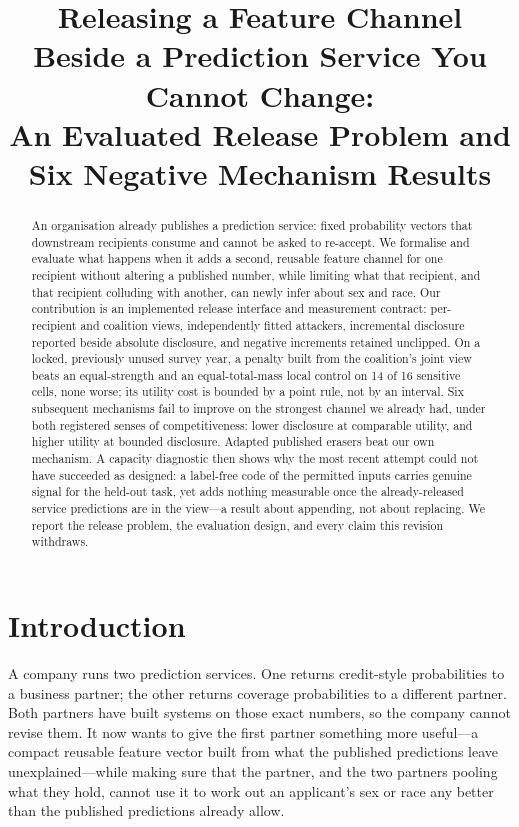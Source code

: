 \documentclass[conference]{IEEEtran}
\begin{document}
\title{Releasing a Feature Channel Beside a Prediction Service You Cannot Change:\\
An Evaluated Release Problem and Six Negative Mechanism Results}

\author{}

\maketitle

\begin{abstract}
An organisation already publishes a prediction service: fixed probability vectors that downstream
recipients consume and cannot be asked to re-accept. We formalise and evaluate what happens when it adds
a second, reusable feature channel for one recipient without altering a published number, while limiting
what that recipient, and that recipient colluding with another, can newly infer about sex and race. Our
contribution is an implemented release interface and measurement contract: per-recipient and coalition
views, independently fitted attackers, incremental disclosure reported beside absolute disclosure, and
negative increments retained unclipped. On a locked, previously unused survey year, a penalty built from
the coalition's joint view beats an equal-strength and an equal-total-mass local control on 14 of 16
sensitive cells, none worse; its utility cost is bounded by a point rule, not by an interval. Six
subsequent mechanisms fail to improve on the strongest channel we already had, under both registered
senses of competitiveness: lower disclosure at comparable utility, and higher utility at bounded
disclosure. Adapted published erasers beat our own mechanism. A capacity diagnostic then shows why the
most recent attempt could not have succeeded as designed: a label-free code of the permitted inputs
carries genuine signal for the held-out task, yet adds nothing measurable once the already-released
service predictions are in the view---a result about appending, not about replacing. We report the release problem, the evaluation design, and every
claim this revision withdraws.
\end{abstract}

\section{Introduction}

A company runs two prediction services. One returns credit-style probabilities to a business partner;
the other returns coverage probabilities to a different partner. Both partners have built systems on
those exact numbers, so the company cannot revise them. It now wants to give the first partner something
more useful---a compact reusable feature vector built from what the published predictions leave
unexplained---while making sure that the partner, and the two partners pooling what they hold, cannot use
it to work out an applicant's sex or race any better than the published predictions already allow.
\end{document}
